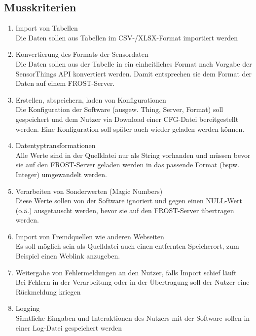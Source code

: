\documentclass[12 pt]{article}
\begin{document}
	\subsection{Musskriterien}
	\begin{enumerate}
		\item Import von Tabellen \\
		Die Daten sollen aus Tabellen im CSV-/XLSX-Format importiert werden
		\item Konvertierung des Formats der Sensordaten \\
		Die Daten sollen aus der Tabelle in ein einheitliches Format nach Vorgabe der SensorThings API konvertiert werden. Damit entsprechen sie dem Format der Daten auf einem FROST-Server.
		\item Erstellen, abspeichern, laden von Konfigurationen \\
		Die Konfiguration der Software (ausgew. Thing, Server, Format) soll gespeichert und dem Nutzer via Download einer CFG-Datei bereitgestellt werden. Eine Konfiguration soll später auch wieder geladen werden können.
		\item Datentyptransformationen \\
		Alle Werte sind in der Quelldatei nur als String vorhanden und müssen bevor sie auf den FROST-Server geladen werden in das passende Format (bspw. Integer) umgewandelt werden.
		\item Verarbeiten von Sonderwerten (Magic Numbers) \\
		Diese Werte sollen von der Software ignoriert und gegen einen NULL-Wert (o.ä.) ausgetauscht werden, bevor sie auf den FROST-Server übertragen werden.
		\item Import von Fremdquellen wie anderen Webseiten \\
		Es soll möglich sein als Quelldatei auch einen entfernten Speicherort, zum Beispiel einen Weblink  anzugeben.
		\item Weitergabe von Fehlermeldungen an den Nutzer, falls Import schief läuft \\
		Bei Fehlern in der Verarbeitung oder in der Übertragung soll der Nutzer eine Rückmeldung kriegen
		\item Logging \\
		Sämtliche Eingaben und Interaktionen des Nutzers mit der Software sollen in einer Log-Datei gespeichert werden
	\end{enumerate}
	
\end{document}
